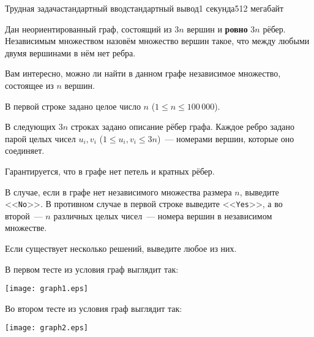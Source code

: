 \begin{problem}{Трудная задача}{стандартный ввод}{стандартный вывод}{1 секунда}{512 мегабайт}

Дан неориентированный граф, состоящий из $3n$ вершин и \textbf{ровно} $3n$ рёбер. Независимым множеством назовём множество вершин такое, что между любыми двумя вершинами в нём нет ребра.

Вам интересно, можно ли найти в данном графе независимое множество, состоящее из $n$ вершин.


\InputFile
В первой строке задано целое число $n$ ($1 \leq n \leq 100\,000$).

В следующих $3n$ строках задано описание рёбер графа. Каждое ребро задано парой целых чисел $u_i, v_i$ ($1 \leq u_i, v_i \leq 3n$)~--- номерами вершин, которые оно соединяет.

Гарантируется, что в графе нет петель и кратных рёбер.


\OutputFile
В случае, если в графе нет независимого множества размера $n$, выведите <<\texttt{No}>>. В противном случае в первой строке выведите <<\texttt{Yes}>>, а во второй~--- $n$ различных целых чисел~--- номера вершин в независимом множестве.

Если существует несколько решений, выведите любое из них.


\Examples

\begin{example}
%
%
\end{example}

\Note
В первом тесте из условия граф выглядит так:


\begin{center}
\texttt{[image: graph1.eps]}
\end{center}


Во втором тесте из условия граф выглядит так:

\begin{center}
\texttt{[image: graph2.eps]}
\end{center}


\end{problem}

